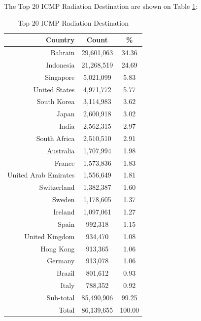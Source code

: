 \newpage
The Top 20 ICMP Radiation Destination are shown on Table \ref{tab:top20icmpradiationdestination}:
\begin{table}[!h]
\begin{center}
\caption{Top 20 ICMP Radiation Destination}
\label{tab:top20icmpradiationdestination}
\begin{tabular}{ |r|c|c| }
\hline
\centering Country & Count & \%  \\
\hline
Bahrain & 29,601,063 & 34.36  \\
Indonesia & 21,268,519 & 24.69  \\
Singapore & 5,021,099 & 5.83  \\
United States & 4,971,772 & 5.77  \\
South Korea & 3,114,983 & 3.62  \\
Japan & 2,600,918 & 3.02  \\
India & 2,562,315 & 2.97  \\
South Africa & 2,510,510 & 2.91  \\
Australia & 1,707,994 & 1.98  \\
France & 1,573,836 & 1.83  \\
United Arab Emirates & 1,556,649 & 1.81  \\
Switzerland & 1,382,387 & 1.60  \\
Sweden & 1,178,605 & 1.37  \\
Ireland & 1,097,061 & 1.27  \\
Spain & 992,318 & 1.15  \\
United Kingdom & 934,470 & 1.08  \\
Hong Kong & 913,365 & 1.06  \\
Germany & 913,078 & 1.06  \\
Brazil & 801,612 & 0.93  \\
Italy & 788,352 & 0.92  \\
\hline
Sub-total & 85,490,906 & 99.25  \\
\hline
Total & 86,139,655 & 100.00  \\
\hline
\end{tabular}
\end{center}
\end{table}

